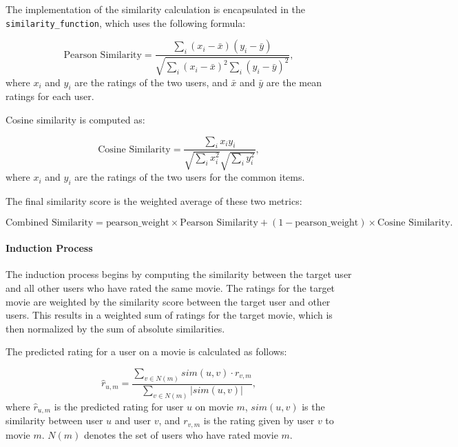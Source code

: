 \documentclass[a4paper,10pt]{article}
\begin{document}
The implementation of the similarity calculation is encapsulated in the \texttt{similarity\_function}, which uses the following formula:

\begin{equation}
    \text{Pearson Similarity} = \frac{\sum_{i} (x_i - \bar{x})(y_i - \bar{y})}{\sqrt{\sum_{i} (x_i - \bar{x})^2 \sum_{i} (y_i - \bar{y})^2}},
\end{equation}
where \( x_i \) and \( y_i \) are the ratings of the two users, and \( \bar{x} \) and \( \bar{y} \) are the mean ratings for each user.

Cosine similarity is computed as:

\begin{equation}
    \text{Cosine Similarity} = \frac{\sum_{i} x_i y_i}{\sqrt{\sum_{i} x_i^2} \sqrt{\sum_{i} y_i^2}},
\end{equation}
where \( x_i \) and \( y_i \) are the ratings of the two users for the common items.

The final similarity score is the weighted average of these two metrics:

\begin{equation}
    \text{Combined Similarity} = \text{pearson\_weight} \times \text{Pearson Similarity} + (1 - \text{pearson\_weight}) \times \text{Cosine Similarity}.
\end{equation}

\paragraph{Induction Process}
The induction process begins by computing the similarity between the target user and all other users who have rated the same movie. The ratings for the target movie are weighted by the similarity score between the target user and other users. This results in a weighted sum of ratings for the target movie, which is then normalized by the sum of absolute similarities.

The predicted rating for a user on a movie is calculated as follows:

\begin{equation}
    \hat{r}_{u,m} = \frac{\sum_{v \in N(m)} sim(u,v) \cdot r_{v,m}}{\sum_{v \in N(m)} |sim(u,v)|},
\end{equation}
where \( \hat{r}_{u,m} \) is the predicted rating for user \( u \) on movie \( m \), \( sim(u,v) \) is the similarity between user \( u \) and user \( v \), and \( r_{v,m} \) is the rating given by user \( v \) to movie \( m \). \( N(m) \) denotes the set of users who have rated movie \( m \).
\end{document}
